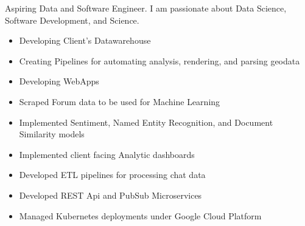 \documentclass[10pt,a4paper]{altacv}
\begin{document}

\begin{fullwidth}
  \makecvheader

\end{fullwidth}


Aspiring Data and Software Engineer. I am passionate about Data Science, Software Development, and Science.



\begin{itemize}
  \item Developing Client's Datawarehouse
  \item Creating Pipelines for automating analysis, rendering, and parsing geodata
  \item Developing WebApps
\end{itemize}

\divider

\begin{itemize}
  \item Scraped Forum data to be used for Machine Learning
  \item Implemented Sentiment, Named Entity Recognition, and Document Similarity models
  \item Implemented client facing Analytic dashboards
  \item Developed ETL pipelines for processing chat data
  \item Developed REST Api and PubSub Microservices
  \item Managed Kubernetes deployments under Google Cloud Platform
\end{itemize}
\end{document}
